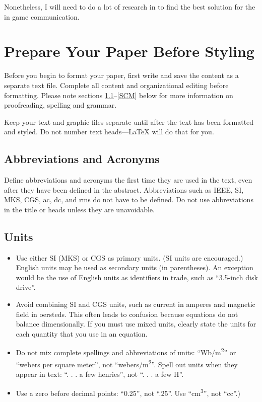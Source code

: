 \documentclass[conference]{IEEEtran}
\begin{document}
Nonetheless, I will need to do a lot of research in to find the best solution for the in game communication.

\section{Prepare Your Paper Before Styling}
Before you begin to format your paper, first write and save the content as a 
separate text file. Complete all content and organizational editing before 
formatting. Please note sections \ref{AA}--\ref{SCM} below for more information on 
proofreading, spelling and grammar.

Keep your text and graphic files separate until after the text has been 
formatted and styled. Do not number text heads---{\LaTeX} will do that 
for you.

\subsection{Abbreviations and Acronyms}\label{AA}
Define abbreviations and acronyms the first time they are used in the text, 
even after they have been defined in the abstract. Abbreviations such as 
IEEE, SI, MKS, CGS, ac, dc, and rms do not have to be defined. Do not use 
abbreviations in the title or heads unless they are unavoidable.

\subsection{Units}
\begin{itemize}
\item Use either SI (MKS) or CGS as primary units. (SI units are encouraged.) English units may be used as secondary units (in parentheses). An exception would be the use of English units as identifiers in trade, such as ``3.5-inch disk drive''.
\item Avoid combining SI and CGS units, such as current in amperes and magnetic field in oersteds. This often leads to confusion because equations do not balance dimensionally. If you must use mixed units, clearly state the units for each quantity that you use in an equation.
\item Do not mix complete spellings and abbreviations of units: ``Wb/m\textsuperscript{2}'' or ``webers per square meter'', not ``webers/m\textsuperscript{2}''. Spell out units when they appear in text: ``. . . a few henries'', not ``. . . a few H''.
\item Use a zero before decimal points: ``0.25'', not ``.25''. Use ``cm\textsuperscript{3}'', not ``cc''.)
\end{itemize}
\end{document}
